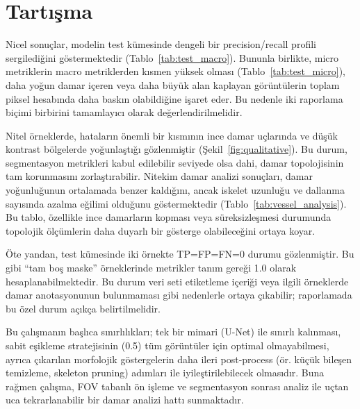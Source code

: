 \section{Tartışma}
Nicel sonuçlar, modelin test kümesinde dengeli bir precision/recall profili sergilediğini göstermektedir (Tablo~\ref{tab:test_macro}). Bununla birlikte, micro metriklerin macro metriklerden kısmen yüksek olması (Tablo~\ref{tab:test_micro}), daha yoğun damar içeren veya daha büyük alan kaplayan görüntülerin toplam piksel hesabında daha baskın olabildiğine işaret eder. Bu nedenle iki raporlama biçimi birbirini tamamlayıcı olarak değerlendirilmelidir.

Nitel örneklerde, hataların önemli bir kısmının ince damar uçlarında ve düşük kontrast bölgelerde yoğunlaştığı gözlenmiştir (Şekil~\ref{fig:qualitative}). Bu durum, segmentasyon metrikleri kabul edilebilir seviyede olsa dahi, damar topolojisinin tam korunmasını zorlaştırabilir. Nitekim damar analizi sonuçları, damar yoğunluğunun ortalamada benzer kaldığını, ancak iskelet uzunluğu ve dallanma sayısında azalma eğilimi olduğunu göstermektedir (Tablo~\ref{tab:vessel_analysis}). Bu tablo, özellikle ince damarların kopması veya süreksizleşmesi durumunda topolojik ölçümlerin daha duyarlı bir gösterge olabileceğini ortaya koyar.

Öte yandan, test kümesinde iki örnekte TP=FP=FN=0 durumu gözlenmiştir. Bu gibi “tam boş maske” örneklerinde metrikler tanım gereği 1.0 olarak hesaplanabilmektedir. Bu durum veri seti etiketleme içeriği veya ilgili örneklerde damar anotasyonunun bulunmaması gibi nedenlerle ortaya çıkabilir; raporlamada bu özel durum açıkça belirtilmelidir.

Bu çalışmanın başlıca sınırlılıkları; tek bir mimari (U-Net) ile sınırlı kalınması, sabit eşikleme stratejisinin (0.5) tüm görüntüler için optimal olmayabilmesi, ayrıca çıkarılan morfolojik göstergelerin daha ileri post-process (ör. küçük bileşen temizleme, skeleton pruning) adımları ile iyileştirilebilecek olmasıdır. Buna rağmen çalışma, FOV tabanlı ön işleme ve segmentasyon sonrası analiz ile uçtan uca tekrarlanabilir bir damar analizi hattı sunmaktadır.
